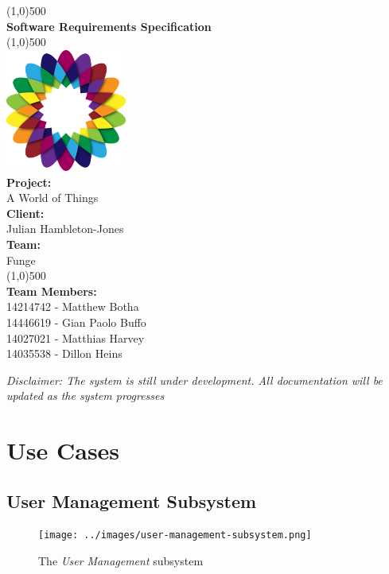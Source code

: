 \documentclass{article}
\begin{document}
	
	\begin{titlepage}
		\begin{center}
			\line(1,0){500}\\
			[6mm]
			\huge{\bfseries Software Requirements Specification}\\
			\line(1,0){500}\\
			[5mm]
			\includegraphics[width=150px]{../images/AWorldOfPlants.png}
			\\
			[5mm]
			\large\textbf{Project:}\\A World of Things\\
			[3mm]
			\large\textbf{Client:}\\Julian Hambleton-Jones\\
			[3mm]
			\large \textbf{Team:}\\Funge\\
			\line(1,0){500}\\
			[5mm]
			\large \textbf{Team Members:}\\
			[3mm]
			\large 14214742 - Matthew Botha\\
			\large 14446619 - Gian Paolo Buffo\\
			\large 14027021 - Matthias Harvey\\
			\large 14035538 - Dillon Heins\\[3mm]
		\end{center}
	\end{titlepage}
	
	\cleardoublepage
	\thispagestyle{empty}
	\tableofcontents
	\cleardoublepage
	\setcounter{page}{1}
	
	\textit{Disclaimer: The system is still under development. All documentation will be updated as the system progresses}

\section{Use Cases}
	\subsection{User Management Subsystem}
		\begin{figure}[H]
			\centering
			\texttt{[image: ../images/user-management-subsystem.png]}
			\caption{The \emph{User Management} subsystem}
		\end{figure}
\end{document}
